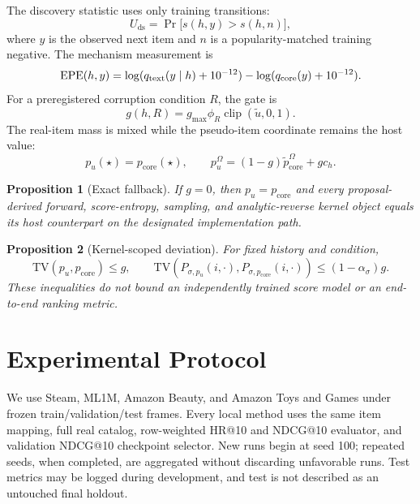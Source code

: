 \documentclass[letterpaper]{article}
\newcommand{\pcore}{p_{\mathrm{core}}}
\newcommand{\pu}{p_u}
\newcommand{\ch}{c_h}
\newcommand{\ut}{\widetilde u}
\newcommand{\Uds}{U_{\mathrm{ds}}}
\newcommand{\TV}{\mathrm{TV}}
\newtheorem{proposition}{Proposition}
\begin{document}
The discovery statistic uses only training transitions:
\begin{equation}
\Uds=\Pr\big[s(h,y)>s(h,n)\big],
\end{equation}
where $y$ is the observed next item and $n$ is a popularity-matched training negative. The mechanism measurement is
\begin{equation}
\mathrm{EPE}(h,y)=\log(q_{\rm text}(y\mid h)+10^{-12})-\log(q_{\rm core}(y)+10^{-12}).
\end{equation}
For a preregistered corruption condition $R$, the gate is
\begin{equation}
g(h,R)=g_{\max}\phi_R\operatorname{clip}(\ut,0,1).
\end{equation}
The real-item mass is mixed while the pseudo-item coordinate remains the host value:
\begin{equation}
\pu(\star)=\pcore(\star),\qquad
\pu^{\Omega}=(1-g)\widetilde\pcore^{\Omega}+g\ch.
\end{equation}

\begin{proposition}[Exact fallback]
If $g=0$, then $\pu=\pcore$ and every proposal-derived forward, score-entropy, sampling, and analytic-reverse kernel object equals its host counterpart on the designated implementation path.
\end{proposition}

\begin{proposition}[Kernel-scoped deviation]
For fixed history and condition,
\begin{equation}
\TV(\pu,\pcore)\le g,
\qquad
\TV(P_{\sigma,\pu}(i,\cdot),P_{\sigma,\pcore}(i,\cdot))\le(1-\alpha_\sigma)g.
\end{equation}
These inequalities do not bound an independently trained score model or an end-to-end ranking metric.
\end{proposition}

\section{Experimental Protocol}
We use Steam, ML1M, Amazon Beauty, and Amazon Toys and Games under frozen train/validation/test frames. Every local method uses the same item mapping, full real catalog, row-weighted HR@10 and NDCG@10 evaluator, and validation NDCG@10 checkpoint selector. New runs begin at seed 100; repeated seeds, when completed, are aggregated without discarding unfavorable runs. Test metrics may be logged during development, and test is not described as an untouched final holdout.
\end{document}
